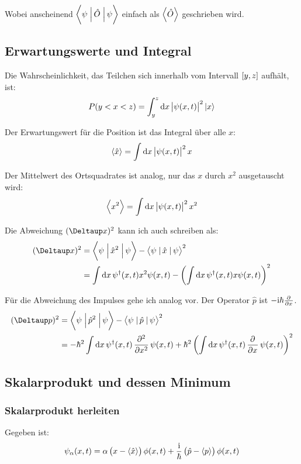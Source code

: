 Wobei anscheinend $\braproket{\psi}{\hat O}{\psi}$ einfach als $\left\langle \hat
O \right\rangle$ geschrieben wird.

\subsection{Erwartungswerte und Integral}

Die Wahrscheinlichkeit, das Teilchen sich innerhalb vom Intervall $\intcc{y,
z}$ aufhält, ist:
\[
	P(y < x < z) = \int_y^z \dif x \, \abs{\psi(x, t)}^2 \ket x
\]

Der Erwartungswert für die Position ist das Integral über alle $x$:
\[
	\bracket{\hat x} = \int\dif x \, \abs{\psi(x, t)}^2 x
\]

Der Mittelwert des Ortsquadrates ist analog, nur das $x$ durch $x^2$
ausgetauscht wird:
\[
	\bracket{x^2} = \int\dif x \, \abs{\psi(x, t)}^2 x^2
\]

Die Abweichung $(\Deltaup x)^2$ kann ich auch schreiben als:
\begin{align*}
	(\Deltaup x)^2
	&= \braproket{\psi}{\hat x^2}{\psi} - \braproket{\psi}{\hat x}{\psi}^2 \\
	&= \int \dif x \, \psi^\dagger(x, t) x^2 \psi(x, t) - \del{\int \dif x \, \psi^\dagger(x, t) x \psi(x, t)}^2
\end{align*}

Für die Abweichung des Impulses gehe ich analog vor. Der Operator $\hat p$ ist
$- \ii \hbar \pd{}x$.
\begin{align*}
	(\Deltaup p)^2
	&= \braproket{\psi}{\hat p^2}{\psi} - \braproket{\psi}{\hat p}{\psi}^2 \\
	&= - \hbar^2 \int \dif x \, \psi^\dagger(x, t) \dpd[2]{}x \psi(x, t) + \hbar^2 \del{\int \dif x \, \psi^\dagger(x, t) \dpd{}x \psi(x, t)}^2
\end{align*}

\subsection{Skalarprodukt und dessen Minimum}

\subsubsection{Skalarprodukt herleiten}

Gegeben ist:
\[
	\psi_\alpha(x, t) = \alpha \del{x - \bracket{\hat x}} \phi(x, t) + \frac\ii\hbar \del{\hat p - \bracket p} \phi(x, t)
\]

